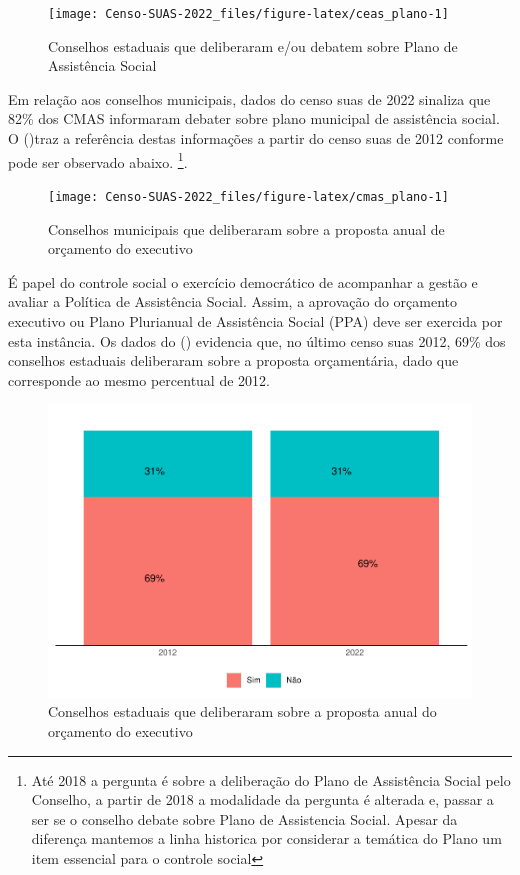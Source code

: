 \documentclass[
  brazilian]{report}
\begin{document}
\begin{figure}
\texttt{[image: Censo-SUAS-2022\_files/figure-latex/ceas\_plano-1]} \caption[Conselhos estaduais que deliberaram e/ou debatem sobre Plano de Assistência Social]{Conselhos estaduais que deliberaram e/ou debatem sobre Plano de Assistência Social}\label{fig:ceas_plano}
\end{figure}

Em relação aos conselhos municipais, dados do censo suas de 2022
sinaliza que 82\% dos CMAS informaram debater sobre plano municipal de
assistência social. O ()traz a referência destas
informações a partir do censo suas de 2012 conforme pode ser observado
abaixo.
\footnote{Até 2018 a pergunta é sobre a deliberação do Plano de Assistência Social pelo Conselho, a partir de 2018 a modalidade da pergunta é alterada e, passar a ser se o conselho debate sobre Plano de Assistencia Social. Apesar da diferença mantemos a linha historica por considerar a temática do Plano um item essencial para o controle social}.

\begin{figure}
\texttt{[image: Censo-SUAS-2022\_files/figure-latex/cmas\_plano-1]} \caption[Conselhos municipais que deliberaram sobre a proposta anual de orçamento do executivo]{Conselhos municipais que deliberaram sobre a proposta anual de orçamento do executivo}\label{fig:cmas_plano}
\end{figure}

É papel do controle social o exercício democrático de acompanhar a
gestão e avaliar a Política de Assistência Social. Assim, a aprovação do
orçamento executivo ou Plano Plurianual de Assistência Social (PPA) deve
ser exercida por esta instância. Os dados do ()
evidencia que, no último censo suas 2012, 69\% dos conselhos estaduais
deliberaram sobre a proposta orçamentária, dado que corresponde ao mesmo
percentual de 2012.

\begin{figure}
\includegraphics{Censo-SUAS-2022_files/figure-latex/ceas_ppa-1} \caption[Conselhos estaduais que deliberaram sobre a proposta anual do orçamento do executivo]{Conselhos estaduais que deliberaram sobre a proposta anual do orçamento do executivo}\label{fig:ceas_ppa}
\end{figure}
\end{document}
